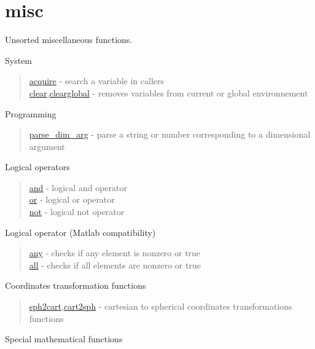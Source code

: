 \chapter*{misc}

Unsorted miscellaneous functions.

System

\begin{quote}
\noindent
\hyperlink{acquire}{acquire} - search a variable in callers  \\
\hyperlink{clear}{clear},\hyperlink{clearglobal}{clearglobal} - removes variables from current or global environnement  \\
\end{quote}


Programming

\begin{quote}
\noindent
\hyperlink{parse_dim_arg}{parse\_dim\_arg} - parse a string or number corresponding to a dimensional argument \\
\end{quote}


Logical operators
\begin{quote}
\noindent
\hyperlink{and}{and} - logical and operator \\
\hyperlink{or}{or} - logical or operator \\
\hyperlink{not}{not} - logical not operator \\
\end{quote}

Logical operator (Matlab compatibility)

\begin{quote}
\noindent
\hyperlink{any}{any} - checks if any element is nonzero or true  \\
\hyperlink{all}{all} - checks if all elements are nonzero or true \\
\end{quote}

Coordinates transformation functions

\begin{quote}
\noindent
\hyperlink{sph2cart}{sph2cart},\hyperlink{cart2sph}{cart2sph} -
cartesian to spherical coordinates transformations functions \\
\end{quote}


Special mathematical functions

